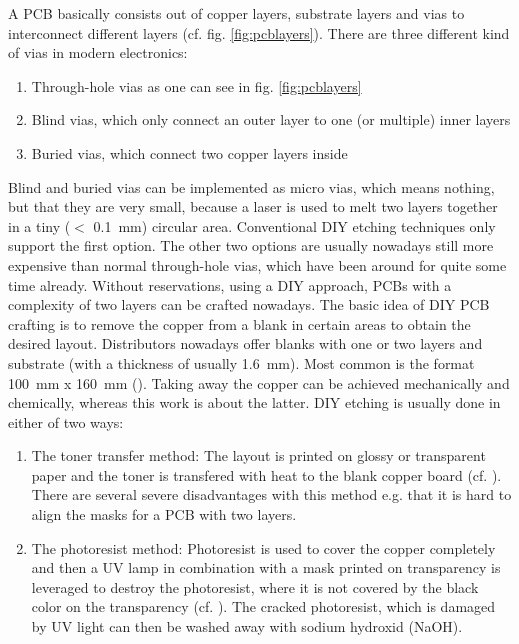 A \gls{PCB} basically consists out of copper layers, substrate layers and vias to interconnect different layers (cf. fig. \ref{fig:pcblayers}). There are three different kind of vias in modern electronics:
\begin{enumerate}
\item Through-hole vias as one can see in fig. \ref{fig:pcblayers}
\item Blind vias, which only connect an outer layer to one (or multiple) inner layers
\item Buried vias, which connect two copper layers inside
\end{enumerate}
Blind and buried vias can be implemented as micro vias, which means nothing, but that they are very small, because a laser is used to melt two layers together in a tiny (\ensuremath{<} \SI{0.1}{\milli\metre}) circular area. Conventional \gls{DIY} etching techniques only support the first option. The other two options are usually nowadays still more expensive than normal through-hole vias, which have been around for quite some time already.  Without reservations, using a \gls{DIY} approach, \glspl{PCB} with a complexity of two layers can be crafted nowadays. The basic idea of \gls{DIY} \gls{PCB} crafting is to remove the copper from a blank in certain areas to obtain the desired layout. Distributors nowadays offer blanks with one or two layers and substrate (with a thickness of usually \SI{1.6}{\milli\metre}). Most common is the format \SI{100}{\milli\metre} x \SI{160}{\milli\metre} (). Taking away the copper can be achieved mechanically and chemically, whereas this work is about the latter.  
\newpar
\gls{DIY} etching is usually done in either of two ways: 
\begin{enumerate}
\item The toner transfer method: The layout is printed on glossy or transparent paper and the toner is transfered with heat to the blank copper board (cf. \cite{online:instructtoner}). There are several severe disadvantages with this method e.g. that it is hard to align the masks for a \gls{PCB} with two layers.  
\item The photoresist method: Photoresist is used to cover the copper completely and then a \gls{UV} lamp in combination with a mask printed on transparency is leveraged to destroy the photoresist, where it is not covered by the black color on the transparency (cf. \cite{online:instructphoto}). The cracked photoresist, which is damaged by \gls{UV} light can then be washed away with sodium hydroxid (NaOH). 
\end{enumerate}
